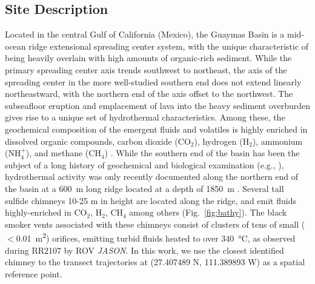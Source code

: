\subsection{Site Description}
Located in the central Gulf of California (Mexico), the Guaymas Basin is a mid-ocean ridge extensional spreading center system, with the unique characteristic of being heavily overlain with high amounts of organic-rich sediment. While the primary spreading center axis trends southwest to northeast, the axis of the spreading center in the more well-studied southern end does not extend linearly northeastward, with the northern end of the axis offset to the northwest. The subseafloor eruption and emplacement of lava into the heavy sediment overburden gives rise to a unique set of hydrothermal characteristics. Among these, the geochemical composition of the emergent fluids and volatiles is highly enriched in dissolved organic compounds, carbon dioxide (CO$_2$), hydrogen (H$_2$), ammonium (NH$_{4}^{+}$), and methane (CH$_4$) \cite{seewald1994variations, von1985chemistry}. While the southern end of the basin has been the subject of a long history of geochemical and biological examination (e.g., \cite{ondreas2018recent, teske2016guaymas, seewald1994variations, von1985chemistry, lonsdale1985hydrothermal}), hydrothermal activity was only recently documented along the northern end of the basin at a \SI{600}{\meter} long ridge located at a depth of \SI{1850}{\meter} \cite{soule2018exploration, geilert2018formation}. Several tall sulfide chimneys 10-25 m in height are located along the ridge, and emit fluids highly-enriched in CO$_2$, H$_2$, CH$_4$ among others (Fig.~\ref{fig:bathy}). The black smoker vents associated with these chimneys consist of clusters of tens of small ($<$\SI{0.01}{\meter\squared}) orifices, emitting turbid fluids heated to over \SI{340}{\celsius}, as observed during RR2107 by ROV \emph{JASON}. In this work, we use the closest identified chimney to the transect trajectories at (27.407489 N, 111.389893 W) as a spatial reference point.

